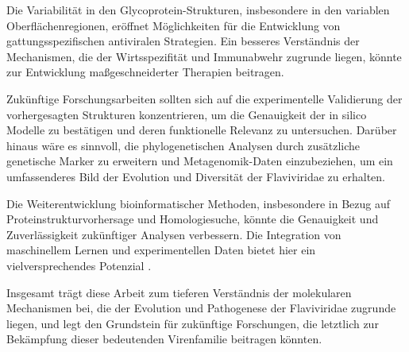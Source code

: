Die Variabilität in den Glycoprotein-Strukturen, insbesondere in den variablen Oberflächenregionen, eröffnet Möglichkeiten für die Entwicklung von gattungsspezifischen antiviralen Strategien. Ein besseres Verständnis der Mechanismen, die der Wirtsspezifität und Immunabwehr zugrunde liegen, könnte zur Entwicklung maßgeschneiderter Therapien beitragen.

Zukünftige Forschungsarbeiten sollten sich auf die experimentelle Validierung der vorhergesagten Strukturen konzentrieren, um die Genauigkeit der in silico Modelle zu bestätigen und deren funktionelle Relevanz zu untersuchen. Darüber hinaus wäre es sinnvoll, die phylogenetischen Analysen durch zusätzliche genetische Marker zu erweitern und Metagenomik-Daten einzubeziehen, um ein umfassenderes Bild der Evolution und Diversität der Flaviviridae zu erhalten.

Die Weiterentwicklung bioinformatischer Methoden, insbesondere in Bezug auf Proteinstrukturvorhersage und Homologiesuche, könnte die Genauigkeit und Zuverlässigkeit zukünftiger Analysen verbessern. Die Integration von maschinellem Lernen und experimentellen Daten bietet hier ein vielversprechendes Potenzial \autocite{Senior2020}.

Insgesamt trägt diese Arbeit zum tieferen Verständnis der molekularen Mechanismen bei, die der Evolution und Pathogenese der Flaviviridae zugrunde liegen, und legt den Grundstein für zukünftige Forschungen, die letztlich zur Bekämpfung dieser bedeutenden Virenfamilie beitragen könnten.